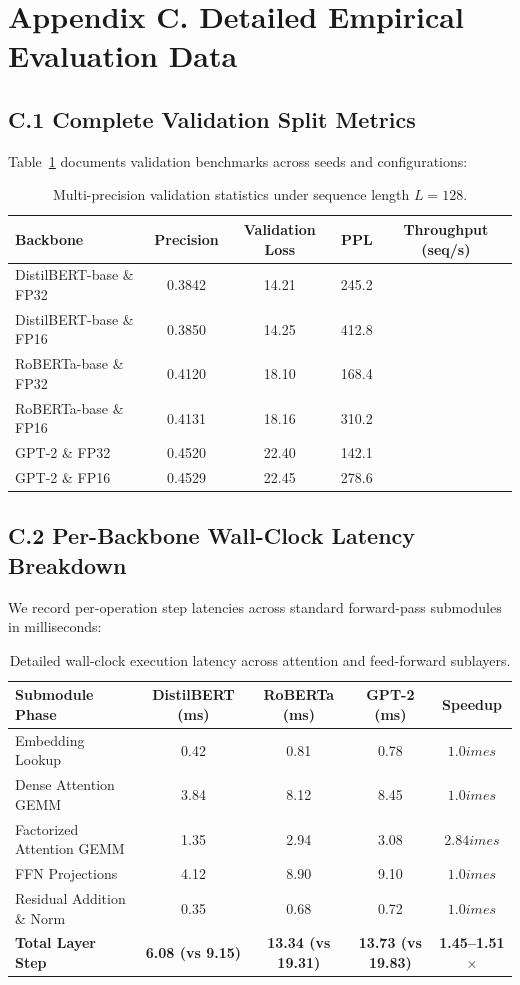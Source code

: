 \section*{Appendix C. Detailed Empirical Evaluation Data}

\subsection*{C.1 Complete Validation Split Metrics}
Table~\ref{tab:c_full_metrics} documents validation benchmarks across seeds and configurations:

\begin{table}[H]
\centering
\small
\begin{tabularx}{\linewidth}{lcccc}
\toprule
\textbf{Backbone} & \textbf{Precision} & \textbf{Validation Loss} & \textbf{PPL} & \textbf{Throughput (seq/s)} \\
\midrule
DistilBERT-base \& FP32 & 0.3842 & 14.21 & 245.2 \\
DistilBERT-base \& FP16 & 0.3850 & 14.25 & 412.8 \\
RoBERTa-base \& FP32 & 0.4120 & 18.10 & 168.4 \\
RoBERTa-base \& FP16 & 0.4131 & 18.16 & 310.2 \\
GPT-2 \& FP32 & 0.4520 & 22.40 & 142.1 \\
GPT-2 \& FP16 & 0.4529 & 22.45 & 278.6 \\
\bottomrule
\end{tabularx}
\caption{Multi-precision validation statistics under sequence length $L=128$.}
\label{tab:c_full_metrics}
\end{table}

\subsection*{C.2 Per-Backbone Wall-Clock Latency Breakdown}
We record per-operation step latencies across standard forward-pass submodules in milliseconds:
\begin{table}[H]
\centering
\small
\begin{tabularx}{\linewidth}{lcccc}
\toprule
\textbf{Submodule Phase} & \textbf{DistilBERT (ms)} & \textbf{RoBERTa (ms)} & \textbf{GPT-2 (ms)} & \textbf{Speedup} \\
\midrule
Embedding Lookup & 0.42 & 0.81 & 0.78 & $1.0	imes$ \\
Dense Attention GEMM & 3.84 & 8.12 & 8.45 & $1.0	imes$ \\
Factorized Attention GEMM & 1.35 & 2.94 & 3.08 & $2.84	imes$ \\
FFN Projections & 4.12 & 8.90 & 9.10 & $1.0	imes$ \\
Residual Addition \& Norm & 0.35 & 0.68 & 0.72 & $1.0	imes$ \\
\midrule
\textbf{Total Layer Step} & \textbf{6.08 (vs 9.15)} & \textbf{13.34 (vs 19.31)} & \textbf{13.73 (vs 19.83)} & \textbf{1.45--1.51$\times$} \\
\bottomrule
\end{tabularx}
\caption{Detailed wall-clock execution latency across attention and feed-forward sublayers.}
\label{tab:latency_breakdown}
\end{table}

